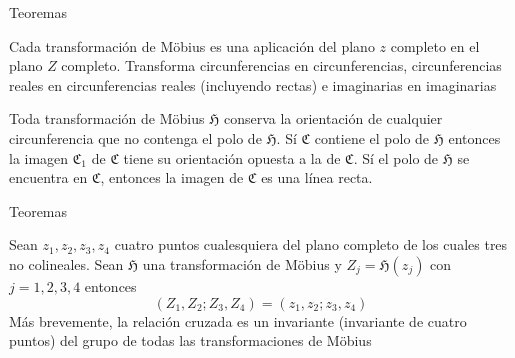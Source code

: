 \documentclass{beamer}
\newenvironment{Teorema}[1]{
  \begin{tcolorbox}[colback=blockbackground,colframe=ritsumeikan,title=#1]
}{
  \end{tcolorbox}
}
\begin{document}
\begin{frame}{Teoremas}
    \begin{Teorema}{Teorema}
        Cada transformación de Möbius es una aplicación del plano $z$ completo en el plano $Z$ completo. Transforma circunferencias en circunferencias, circunferencias reales en circunferencias reales (incluyendo rectas) e imaginarias en imaginarias
    \end{Teorema}
    \begin{Teorema}{Teorema}
        Toda transformación de Möbius $\mathfrak{H}$ conserva la orientación de cualquier circunferencia que no contenga el polo de $\mathfrak{H}$. Sí $\mathfrak{C}$ contiene el polo de $\mathfrak{H}$ entonces la imagen $\mathfrak{C}_1$ de $\mathfrak{C}$ tiene su orientación opuesta a la de $\mathfrak{C}$. Sí el polo de $\mathfrak{H}$ se encuentra en $\mathfrak{C}$, entonces la imagen de $\mathfrak{C}$ es una línea recta.
    \end{Teorema}
\end{frame}

\begin{frame}{Teoremas}
    \begin{Teorema}{Teorema}
        Sean $z_1,z_2,z_3,z_4$ cuatro puntos cualesquiera del plano completo de los cuales tres no colineales. Sean $\mathfrak{H}$ una transformación de Möbius y $Z_j=\mathfrak{H}(z_j)$ con $j=1,2,3,4$ entonces
    \begin{equation*}
        (Z_1,Z_2;Z_3,Z_4)=(z_1,z_2;z_3,z_4)
    \end{equation*}
    Más brevemente, la relación cruzada es un invariante (invariante de cuatro puntos) del grupo de todas las transformaciones de Möbius
    \end{Teorema}
\end{frame}
\end{document}
